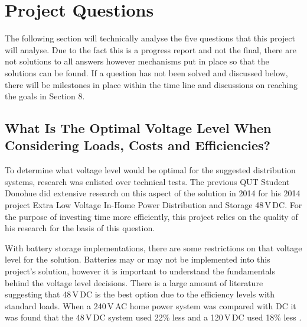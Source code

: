 \section{Project Questions} \label{section:project-questions}

The following section will technically analyse the five questions that this project will analyse. Due to the fact this is a progress report and not the final, there are not solutions to all answers however mechanisms put in place so that the solutions can be found. If a question has not been solved and discussed below, there will be milestones in place within the time line and discussions on reaching the goals in Section 8.

\subsection{What Is The Optimal Voltage Level When Considering Loads, Costs and Efficiencies?} \label{section:question1}

To determine what voltage level would be optimal for the suggested distribution systems, research was enlisted over technical tests. The previous QUT Student Donohue did extensive research on this aspect of the solution in 2014 for his 2014 project Extra Low Voltage In-Home Power Distribution and Storage 48\,V\,DC. For the purpose of investing time more efficiently, this project relies on the quality of his research for the basis of this question. 
\newline

With battery storage implementations, there are some restrictions on that voltage level for the solution. Batteries may or may not be implemented into this project's solution, however it is important to understand the fundamentals behind the voltage level decisions. There is a large amount of literature suggesting that 48\,V\,DC is the best option due to the efficiency levels with standard loads. When a 240\,V\,AC home power system was compared with DC it was found that the 48\,V\,DC system used 22\% less and a 120\,V\,DC used 18\% less \cite{Donohue2014}. 
\newline

